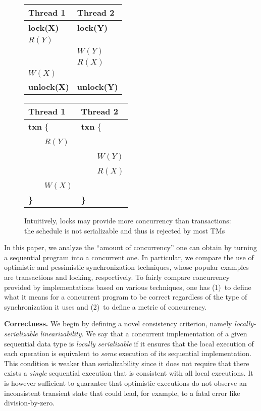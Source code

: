 \documentclass[11pt,pdftex,letterpaper]{article}
\begin{document}
{\begin{figure}[b]
  \setlength\tabcolsep{5pt}
    \footnotesize
    \begin{minipage}[b]{0.4\columnwidth}
      \begin{tabular}{l|l}
	Thread 1 & Thread 2 \\ \hline
	{\bf lock(X)} & {\bf lock(Y)}  \\
	$R(Y)$ & \\
	& $W(Y)$ \\
	& $R(X)$ \\
	$W(X)$ &  \\
	{\bf unlock(X)} & {\bf unlock(Y)}  \\
      \end{tabular}
    \end{minipage}
    \hspace{4em}
    \begin{minipage}[b]{0.4\columnwidth}
      \begin{tabular}{l|l}
	Thread 1 & Thread 2 \\ \hline
	{\bf txn} \{ & {\bf txn} \{ \\
	~~~~$R(Y)$ &  \\
	 & ~~~~$W(Y)$ \\
	& ~~~~$R(X)$ \\
	~~~~$W(X)$ &  \\
        {\bf \}}  &      {\bf \}}\\
      \end{tabular}
    \end{minipage}
  \caption{Intuitively, locks may provide more concurrency than
    transactions: the schedule is not serializable and thus is
    rejected by most TMs}
\label{fig:locksvstm}
\end{figure}
}

In this paper, we analyze the ``amount of concurrency'' one can obtain by turning a sequential program into a concurrent one.
In particular, we compare the use of 
optimistic and pessimistic
synchronization techniques,  whose popular examples are transactions and locking, respectively.
To fairly compare concurrency provided by implementations
based on various techniques,    
one has (1)~to  define what it means for a concurrent program to be
correct regardless of the type of  synchronization it uses and 
(2)~to define a metric of concurrency. 


\vspace{1mm}\noindent\textbf{Correctness.}
We begin by defining a novel consistency criterion,
namely \emph{locally-serializable linearizability}.
We say that a concurrent implementation of a given sequential data type is
\emph{locally serializable} if it
ensures that the local execution of each 
operation 
is equivalent to \emph{some} execution of its sequential implementation.
This condition is weaker than serializability
since it does not require that there exists a \emph{single} sequential 
execution  that is consistent with all local executions.
It is however sufficient to guarantee that optimistic
executions do not observe an inconsistent transient state that could 
lead, for example, to a fatal error like division-by-zero.
\end{document}
